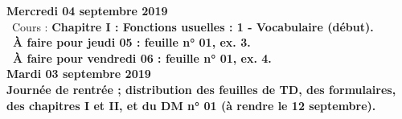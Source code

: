 \documentclass[12pt,a4paper]{article}
\begin{document}
\noindent\textbf{\bf Mercredi 04 septembre 2019}\\
\bu\ Cours : \bf Chapitre I \rm : Fonctions usuelles : 1 - Vocabulaire (début).\\
\bu\ À faire pour jeudi 05 : feuille n° 01, ex. 3.\\
\bu\ À faire pour vendredi 06 : feuille n° 01, ex. 4.\vspace{.4cm}\\
 

\noindent\textbf{\bf Mardi 03 septembre 2019}\\
Journée de rentrée ; distribution des feuilles de TD, des formulaires, des
chapitres I et II, et du DM n° 01 (à rendre le 12 septembre).\vspace{.4cm}\\


\label{end}
\end{document}
